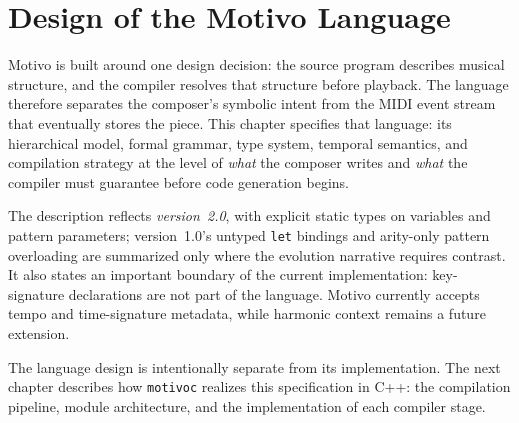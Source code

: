 \chapter{Design of the Motivo Language}\label{ch:language-design}

Motivo is built around one design decision: the source program describes musical structure, and the compiler
resolves that structure before playback.
The language therefore separates the composer's symbolic intent from the MIDI event stream that eventually stores the
piece.
This chapter specifies that language: its hierarchical model, formal grammar, type system, temporal semantics, and
compilation strategy at the level of \textit{what} the composer writes and \textit{what} the compiler must guarantee
before code generation begins.

The description reflects \textit{version~2.0}, with explicit static types on variables and pattern parameters;
version~1.0's untyped \texttt{let} bindings and arity-only pattern overloading are summarized only where the evolution
narrative requires contrast.
It also states an important boundary of the current implementation: key-signature declarations are not part of the
language.
Motivo currently accepts tempo and time-signature metadata, while harmonic context remains a future extension.









The language design is intentionally separate from its implementation.
The next chapter describes how \texttt{motivoc} realizes this specification in C++: the compilation pipeline, module
architecture, and the implementation of each compiler stage.

